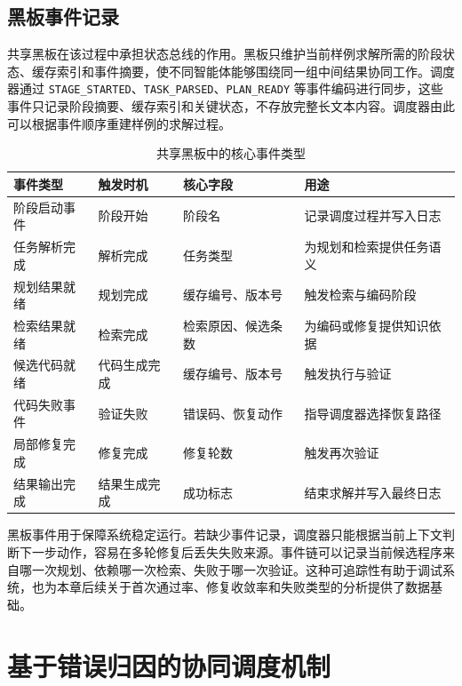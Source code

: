 \subsection{黑板事件记录}

共享黑板在该过程中承担状态总线的作用。黑板只维护当前样例求解所需的阶段状态、缓存索引和事件摘要，使不同智能体能够围绕同一组中间结果协同工作。调度器通过 \texttt{STAGE\_STARTED}、\texttt{TASK\_PARSED}、\texttt{PLAN\_READY} 等事件编码进行同步，这些事件只记录阶段摘要、缓存索引和关键状态，不存放完整长文本内容。调度器由此可以根据事件顺序重建样例的求解过程。

\begin{table}[htbp]
\centering
\small
\caption{共享黑板中的核心事件类型}
\label{tab:blackboard_events}
\renewcommand{\arraystretch}{1.15}
\begin{tabularx}{\textwidth}{
>{\raggedright\arraybackslash}p{2.8cm}
>{\raggedright\arraybackslash}p{2.4cm}
>{\raggedright\arraybackslash}p{3.5cm}
>{\raggedright\arraybackslash}X}
\toprule
事件类型 & 触发时机 & 核心字段 & 用途 \\
\midrule
阶段启动事件 & 阶段开始 & 阶段名 & 记录调度过程并写入日志 \\
任务解析完成 & 解析完成 & 任务类型 & 为规划和检索提供任务语义 \\
规划结果就绪 & 规划完成 & 缓存编号、版本号 & 触发检索与编码阶段 \\
检索结果就绪 & 检索完成 & 检索原因、候选条数 & 为编码或修复提供知识依据 \\
候选代码就绪 & 代码生成完成 & 缓存编号、版本号 & 触发执行与验证 \\
代码失败事件 & 验证失败 & 错误码、恢复动作 & 指导调度器选择恢复路径 \\
局部修复完成 & 修复完成 & 修复轮数 & 触发再次验证 \\
结果输出完成 & 结果生成完成 & 成功标志 & 结束求解并写入最终日志 \\
\bottomrule
\end{tabularx}
\end{table}

黑板事件用于保障系统稳定运行。若缺少事件记录，调度器只能根据当前上下文判断下一步动作，容易在多轮修复后丢失失败来源。事件链可以记录当前候选程序来自哪一次规划、依赖哪一次检索、失败于哪一次验证。这种可追踪性有助于调试系统，也为本章后续关于首次通过率、修复收敛率和失败类型的分析提供了数据基础。

\section{基于错误归因的协同调度机制}

